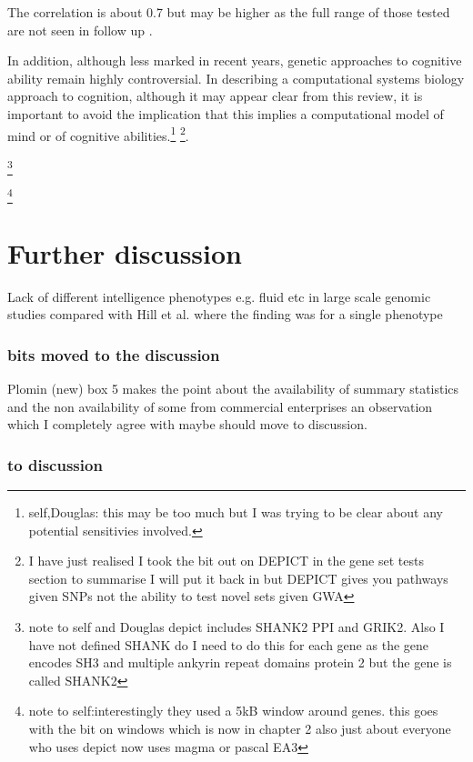 The correlation is about 0.7 but may be higher as the full range of those tested are not seen in follow up \cite{deary2009genetic}.
 
 In addition, although less marked in recent years, genetic approaches to cognitive ability remain highly controversial. In describing a computational systems biology approach to cognition, although it may appear clear from this review, it is important to avoid the implication that this implies a computational model of mind or of cognitive abilities.\footnote{self,Douglas: this may be too much but I was trying to be clear about any potential sensitivies involved.}
\footnote{I have just realised I took the bit out on DEPICT in the gene set tests section to summarise I will put it back in but DEPICT gives you pathways given SNPs not the ability to test novel sets given GWA}.


 \footnote{note to self and Douglas depict includes SHANK2 PPI and GRIK2. Also I have not defined SHANK do I need to do this for each gene as the gene encodes SH3 and multiple ankyrin repeat domains protein 2 but the gene is called SHANK2}
 
 \footnote{note to self:interestingly they used a 5kB window around genes.  this goes with the bit on windows which is now in chapter 2 also just about everyone who uses depict now uses magma or pascal EA3}
 
 
 
 \section{Further discussion}
Lack of different intelligence phenotypes e.g. fluid etc in large scale genomic studies compared with Hill et al. where the finding was for a single phenotype



\subsubsection{bits moved to the discussion}
Plomin (new) \cite{plomin2018new} box 5 makes the point about the availability of summary statistics and the non availability of some from commercial enterprises an observation which I completely agree with maybe should move to discussion.
\subsubsection{to discussion}
\label{sec:other network gsa intro discussion}


